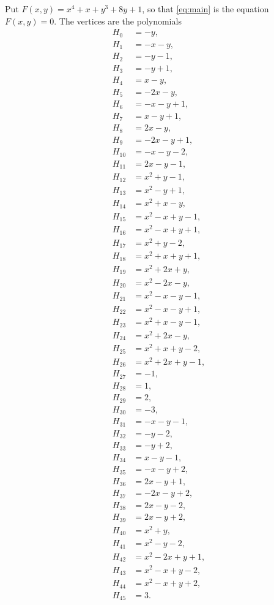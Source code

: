 \documentclass[11pt]{article}
\begin{document}
Put $F(x,y)=x^{4}+x+y^{3}+8y+1$, so that \eqref{eq:main} is the equation $F(x,y)=0$. The vertices are the polynomials
\begin{align*}
H_{0}&=-y,\\
H_{1}&=-x-y,\\
H_{2}&=-y-1,\\
H_{3}&=-y+1,\\
H_{4}&=x-y,\\
H_{5}&=-2x-y,\\
H_{6}&=-x-y+1,\\
H_{7}&=x-y+1,\\
H_{8}&=2x-y,\\
H_{9}&=-2x-y+1,\\
H_{10}&=-x-y-2,\\
H_{11}&=2x-y-1,\\
H_{12}&=x^{2}+y-1,\\
H_{13}&=x^{2}-y+1,\\
H_{14}&=x^{2}+x-y,\\
H_{15}&=x^{2}-x+y-1,\\
H_{16}&=x^{2}-x+y+1,\\
H_{17}&=x^{2}+y-2,\\
H_{18}&=x^{2}+x+y+1,\\
H_{19}&=x^{2}+2x+y,\\
H_{20}&=x^{2}-2x-y,\\
H_{21}&=x^{2}-x-y-1,\\
H_{22}&=x^{2}-x-y+1,\\
H_{23}&=x^{2}+x-y-1,\\
H_{24}&=x^{2}+2x-y,\\
H_{25}&=x^{2}+x+y-2,\\
H_{26}&=x^{2}+2x+y-1,\\
H_{27}&=-1,\\
H_{28}&=1,\\
H_{29}&=2,\\
H_{30}&=-3,\\
H_{31}&=-x-y-1,\\
H_{32}&=-y-2,\\
H_{33}&=-y+2,\\
H_{34}&=x-y-1,\\
H_{35}&=-x-y+2,\\
H_{36}&=2x-y+1,\\
H_{37}&=-2x-y+2,\\
H_{38}&=2x-y-2,\\
H_{39}&=2x-y+2,\\
H_{40}&=x^{2}+y,\\
H_{41}&=x^{2}-y-2,\\
H_{42}&=x^{2}-2x+y+1,\\
H_{43}&=x^{2}-x+y-2,\\
H_{44}&=x^{2}-x+y+2,\\
H_{45}&=3.
\end{align*}
\end{document}
